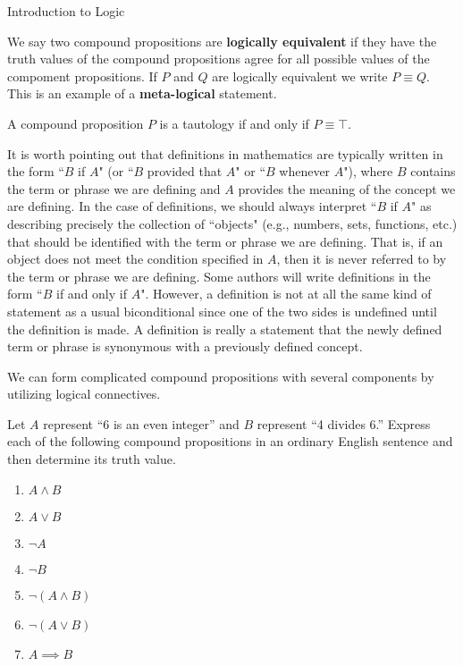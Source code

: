 \begin{section}{Introduction to Logic}
\begin{definition}
  We say two compound propositions are \textbf{logically equivalent}
  if they have the truth values of the compound propositions agree for
  all possible values of the compoment propositions. If $P$ and $Q$
  are logically equivalent we write $ P \equiv Q$. This is an example
  of a \textbf{meta-logical} statement. 
\end{definition}

\begin{example}
  A compound proposition $P$ is a tautology if and only if $P \equiv \top$. 
\end{example}

It is worth pointing out that definitions in mathematics are typically
written in the form ``$B$ if $A$" (or ``$B$ provided that $A$" or
``$B$ whenever $A$"), where $B$ contains the term or phrase we are
defining and $A$ provides the meaning of the concept we are
defining. In the case of definitions, we should always interpret ``$B$
if $A$" as describing precisely the collection of ``objects" (e.g.,
numbers, sets, functions, etc.) that should be identified with the
term or phrase we are defining.  That is, if an object does not meet
the condition specified in $A$, then it is never referred to by the
term or phrase we are defining. Some authors will write definitions in
the form ``$B$ if and only if $A$". However, a definition is not at
all the same kind of statement as a usual biconditional since one of
the two sides is undefined until the definition is made. A definition
is really a statement that the newly defined term or phrase is
synonymous with a previously defined concept.

We can form complicated compound propositions with several components
by utilizing logical connectives.


\begin{problem}\label{prob:translations}
Let $A$ represent ``6 is an even integer'' and $B$ represent ``4 divides 6.''  Express each of the following compound propositions in an ordinary English sentence and then determine its truth value.
\begin{enumerate}[label=\textrm{(\alph*)}]
  \item $A \wedge B$
  \item $A \vee B$
  \item $\neg A$
  \item $\neg B$
  \item $\neg (A \wedge B)$
  \item $\neg (A \vee B)$
  \item $A \implies B$
\end{enumerate}
\end{problem}


\end{section}
